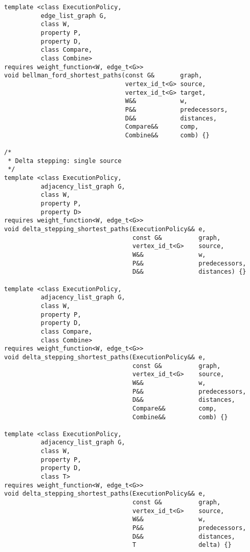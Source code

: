 \begin{lstlisting}
template <class ExecutionPolicy,
          edge_list_graph G,
          class W,
          property P,
          property D,
          class Compare,
          class Combine>
requires weight_function<W, edge_t<G>>
void bellman_ford_shortest_paths(const G&       graph,
                                 vertex_id_t<G> source,
                                 vertex_id_t<G> target,
                                 W&&            w,
                                 P&&            predecessors,
                                 D&&            distances,
                                 Compare&&      comp,
                                 Combine&&      comb) {}

/*
 * Delta stepping: single source
 */
template <class ExecutionPolicy,
          adjacency_list_graph G,
          class W,
          property P,
          property D>
requires weight_function<W, edge_t<G>>
void delta_stepping_shortest_paths(ExecutionPolicy&& e,
                                   const G&          graph,
                                   vertex_id_t<G>    source,
                                   W&&               w,
                                   P&&               predecessors,
                                   D&&               distances) {}

template <class ExecutionPolicy,
          adjacency_list_graph G,
          class W,
          property P,
          property D,
          class Compare,
          class Combine>
requires weight_function<W, edge_t<G>>
void delta_stepping_shortest_paths(ExecutionPolicy&& e,
                                   const G&          graph,
                                   vertex_id_t<G>    source,
                                   W&&               w,
                                   P&&               predecessors,
                                   D&&               distances,
                                   Compare&&         comp,
                                   Combine&&         comb) {}

template <class ExecutionPolicy,
          adjacency_list_graph G,
          class W,
          property P,
          property D,
          class T>
requires weight_function<W, edge_t<G>>
void delta_stepping_shortest_paths(ExecutionPolicy&& e,
                                   const G&          graph,
                                   vertex_id_t<G>    source,
                                   W&&               w,
                                   P&&               predecessors,
                                   D&&               distances,
                                   T                 delta) {}


\end{lstlisting}
